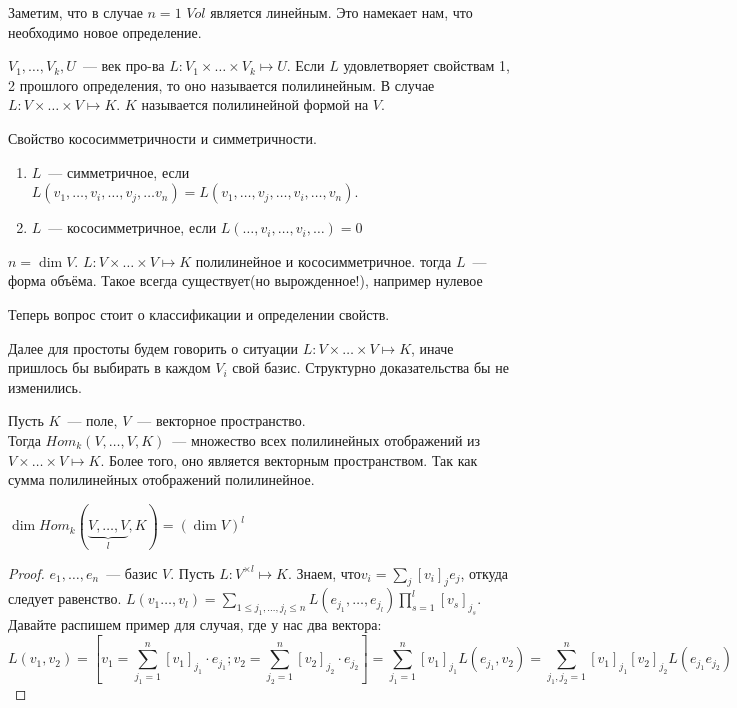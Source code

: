 \begin{remark}
    Заметим, что в случае $n = 1$ $Vol$ является линейным. Это намекает нам, что необходимо
    новое определение.
\end{remark}
\begin{definition}
    $V_1,\dots, V_k, U$~--- век про-ва $L: V_1\times\dots\times V_k\mapsto U$.
    Если $L$ удовлетворяет свойствам 1, 2 прошлого определения, то оно называется полилинейным.
    В случае $L: V\times\dots\times V\mapsto K$. $K$ называется полилинейной формой на $V$.
\end{definition}
\begin{definition}
    Свойство кососимметричности и симметричности.
     \begin{enumerate}
         \item $L$~--- симметричное, если $L(v_1,\dots, v_i, \dots, v_j, \dots v_n) = L(v_1,\dots, v_j,\dots, v_i,\dots, v_n)$.
         \item $L$~--- кососимметричное, если $L(\dots, v_i, \dots, v_i, \dots) = 0$
    \end{enumerate}
\end{definition}
\begin{definition}
    $n = \dim V$. $L: V\times\dots\times V \mapsto K$ полилинейное и кососимметричное.
    тогда $L$~--- форма объёма. Такое всегда существует(но вырожденное!), например нулевое
\end{definition}
\begin{motivation}
    Теперь вопрос стоит о классификации и определении свойств.
\end{motivation}
Далее для простоты будем говорить о ситуации $L: V\times\dots\times V\mapsto K$, иначе
пришлось бы выбирать в каждом $V_i$ свой базис. Структурно доказательства бы не изменились.
\begin{definition}
    Пусть $K$~--- поле, $V$~--- векторное пространство.\\ 
    Тогда $Hom_k(V,\dots, V,K)$~--- множество всех полилинейных отображений
    из $V\times\dots\times V\mapsto K$.
    Более того, оно является векторным пространством. Так как сумма полилинейных
    отображений полилинейное.
\end{definition}
\begin{remark}
    $\dim Hom_k(\underbrace{V,\dots, V}_{l}, K) = (\dim V)^l$ 
\end{remark}
\begin{proof}
    $e_1,\dots, e_n$~--- базис $V$.
    Пусть $L: V^{\times l} \mapsto K$. 
    Знаем, что$v_i = \sum\limits_{j}^{}{[v_i]_je_j}$, откуда следует равенство.
    $L(v_1\dots, v_l) = \sum\limits_{1\le j_1,\dots,j_l\le n}{L(e_{j_1}, \dots, e_{j_l})
    \prod\limits_{s=1}^{l}[v_s]_{j_s}}$.
    Давайте распишем пример для случая, где у нас два вектора:
    \[
        L(v_1, v_2) = \left[v_1 = \sum\limits_{j_1=1}^{n}{[v_1]_{j_1}\cdot e_{j_1}};
        v_2 = \sum\limits_{j_2=1}^{n}{[v_2]_{j_2}\cdot e_{j_2}}\right]=
        \sum\limits_{j_1=1}^{n}{[v_1]_{j_1}L(e_{j_1}, v_2)} =
        \sum\limits_{j_1,j_2=1}^{n}{[v_1]_{j_1}[v_2]_{j_2}L(e_{j_1}e_{j_2})}
    \]
\end{proof}
